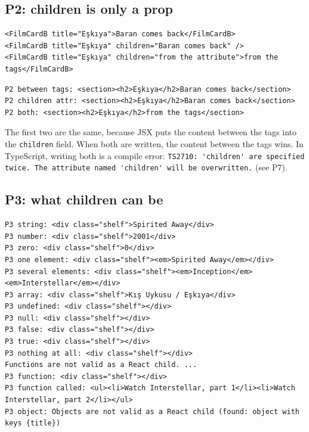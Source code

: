 \documentclass[
]{article}
\newcommand{\passthrough}[1]{#1}
\begin{document}
\hypertarget{p2-children-is-only-a-prop}{%
\subsection{P2: children is only a
prop}\label{p2-children-is-only-a-prop}}

\begin{lstlisting}
<FilmCardB title="Eşkıya">Baran comes back</FilmCardB>
<FilmCardB title="Eşkıya" children="Baran comes back" />
<FilmCardB title="Eşkıya" children="from the attribute">from the tags</FilmCardB>
\end{lstlisting}

\begin{lstlisting}
P2 between tags: <section><h2>Eşkıya</h2>Baran comes back</section>
P2 children attr: <section><h2>Eşkıya</h2>Baran comes back</section>
P2 both: <section><h2>Eşkıya</h2>from the tags</section>
\end{lstlisting}

The first two are the same, because JSX puts the content between the
tags into the \passthrough{\lstinline!children!} field. When both are
written, the content between the tags wins. In TypeScript, writing both
is a compile error:
\passthrough{\lstinline!TS2710: 'children' are specified twice. The attribute named 'children' will be overwritten.!}
(see P7).

\hypertarget{p3-what-children-can-be}{%
\subsection{P3: what children can be}\label{p3-what-children-can-be}}

\begin{lstlisting}
P3 string: <div class="shelf">Spirited Away</div>
P3 number: <div class="shelf">2001</div>
P3 zero: <div class="shelf">0</div>
P3 one element: <div class="shelf"><em>Spirited Away</em></div>
P3 several elements: <div class="shelf"><em>Inception</em><em>Interstellar</em></div>
P3 array: <div class="shelf">Kış Uykusu / Eşkıya</div>
P3 undefined: <div class="shelf"></div>
P3 null: <div class="shelf"></div>
P3 false: <div class="shelf"></div>
P3 true: <div class="shelf"></div>
P3 nothing at all: <div class="shelf"></div>
Functions are not valid as a React child. ...
P3 function: <div class="shelf"></div>
P3 function called: <ul><li>Watch Interstellar, part 1</li><li>Watch Interstellar, part 2</li></ul>
P3 object: Objects are not valid as a React child (found: object with keys {title})
\end{lstlisting}
\end{document}
